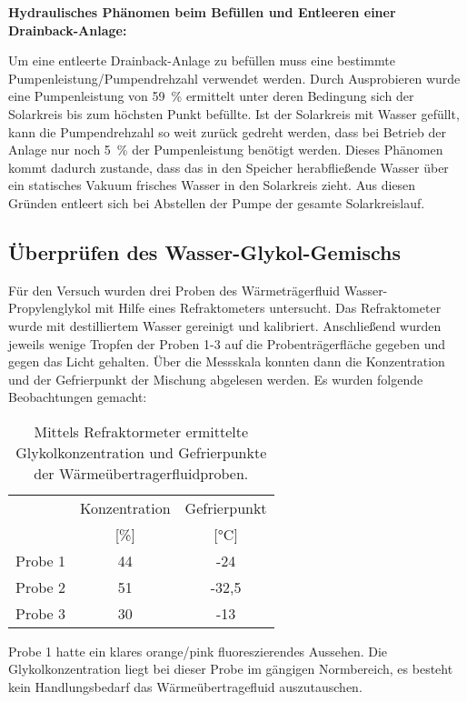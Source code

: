 \textbf{Hydraulisches Phänomen beim Befüllen und Entleeren einer Drainback-Anlage:}

Um eine entleerte Drainback-Anlage zu befüllen muss eine bestimmte Pumpenleistung/Pumpendrehzahl verwendet werden. Durch Ausprobieren wurde eine Pumpenleistung von \SI{59}{\percent} ermittelt unter deren Bedingung sich der Solarkreis bis zum höchsten Punkt befüllte. Ist der Solarkreis mit Wasser gefüllt, kann die Pumpendrehzahl so weit zurück gedreht werden, dass bei Betrieb der Anlage nur noch \SI{5}{\percent} der Pumpenleistung benötigt werden. Dieses Phänomen kommt dadurch zustande, dass das in den Speicher herabfließende Wasser über ein statisches Vakuum frisches Wasser in den Solarkreis zieht. Aus diesen Gründen entleert sich bei Abstellen der Pumpe der gesamte Solarkreislauf. 

\subsection{Überprüfen des Wasser-Glykol-Gemischs}

Für den Versuch wurden drei Proben des Wärmeträgerfluid Wasser-Propylenglykol mit Hilfe eines Refraktometers untersucht. Das Refraktometer wurde mit destilliertem Wasser gereinigt und kalibriert. Anschließend wurden jeweils wenige Tropfen der Proben 1-3 auf die Probenträgerfläche gegeben und gegen das Licht gehalten. Über die Messskala konnten dann die Konzentration und der Gefrierpunkt der Mischung abgelesen werden. Es wurden folgende Beobachtungen gemacht:

	\begin{table}[H]
	\caption{Mittels Refraktormeter ermittelte Glykolkonzentration und Gefrierpunkte der Wärmeübertragerfluidproben.}
	\centering
	\begin{tabular}{lcc}
		& Konzentration  & Gefrierpunkt \\
		&{[}\%{]}& {[}°C{]}\\
		Probe 1 &       44               &          -24           \\
		Probe 2 &       51            &            -32,5     \\
		Probe 3 &           30           &          -13             
	\end{tabular}
\end{table}

Probe 1 hatte ein klares orange/pink fluoreszierendes Aussehen. Die Glykolkonzentration liegt bei dieser Probe im gängigen Normbereich, es besteht kein Handlungsbedarf das Wärmeübertragefluid auszutauschen. 

